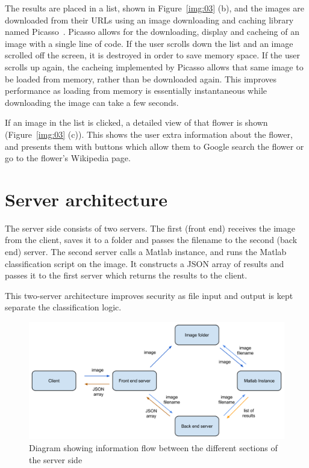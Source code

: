 \documentclass[11pt, a4paper]{report}
\begin{document}
The results are placed in a list, shown in Figure~\ref{img:03} (b), and the images are downloaded from their URLs using an image downloading and caching library named Picasso~\cite{AndroidDev:Picasso}. Picasso allows for the downloading, display and cacheing of an image with a single line of code. If the user scrolls down the list and an image scrolled off the screen, it is destroyed in order to save memory space. If the user scrolls up again, the cacheing implemented by Picasso allows that same image to be loaded from memory, rather than be downloaded again. This improves performance as loading from memory is essentially instantaneous while downloading the image can take a few seconds.

If an image in the list is clicked, a detailed view of that flower is shown (Figure~\ref{img:03} (c)). This shows the user extra information about the flower, and presents them with buttons which allow them to Google search the flower or go to the flower's Wikipedia page. 



\section{Server architecture}


The server side consists of two servers. The first (front end) receives the image from the client, saves it to a folder and passes the filename to the second (back end) server. The second server calls a Matlab instance, and runs the Matlab classification script on the image. It constructs a JSON array of results and passes it to the first server which returns the results to the client. 

This two-server architecture improves security as file input and output is kept separate the classification logic.

\begin{figure}[hbt]
	\centering
  \includegraphics[totalheight=8cm]{img/07.png}
  \caption{Diagram showing information flow between the different sections of the server side}
  \label{svg:01}
\end{figure}
\end{document}
